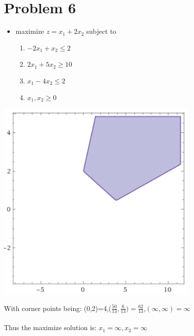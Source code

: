 \documentclass[11pt,a4paper,openany]{report}
\begin{document}
\section*{Problem 6}
\begin{itemize}
  \item maximize \(z=x_1+2x_2\) subject to
  \begin{enumerate}
    \item \(-2x_1+x_2\leq2\)
    \item \(2x_1+5x_2\geq10\)
    \item \(x_1-4x_2\leq2\)
    \item \(x_1,x_2\geq0\)
  \end{enumerate}
\end{itemize}
\begin{center}
  \includegraphics[height=10cm]{images/p6_1}
\end{center}
With corner points being: (0,2)=4,(\(\frac{50}{13},\frac{6}{13})=\frac{62}{13}\),\((\infty,\infty)=\infty\)\\\\
Thus the maximize solution is: \(x_1=\infty,x_2=\infty\)

\newpage
\end{document}
